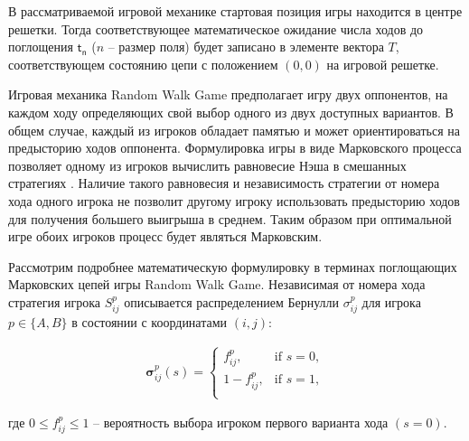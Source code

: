 В рассматриваемой игровой механике стартовая позиция игры находится в центре решетки. 
Тогда соответствующее математическое ожидание числа ходов до поглощения $\boldsymbol{\mathsf{t_n}}$ ($n$ -- размер поля) 
будет записано в элементе вектора $T$, соответствующем состоянию цепи с положением $(0, 0)$ на игровой решетке.


Игровая механика Random Walk Game предполагает игру двух оппонентов, на каждом ходу определяющих свой выбор одного из двух доступных вариантов.
В общем случае, каждый из игроков обладает памятью и может ориентироваться на предысторию ходов оппонента.
Формулировка игры в виде Марковского процесса позволяет одному из игроков вычислить равновесие Нэша в смешанных стратегиях \cite{nash_non-cooperative_1951}.
Наличие такого равновесия и независимость стратегии от номера хода одного игрока не позволит другому игроку использовать предысторию ходов
для получения большего выигрыша в среднем. Таким образом при оптимальной игре обоих игроков процесс будет являться Марковским.

Рассмотрим подробнее математическую формулировку в терминах поглощающих Марковских цепей игры Random Walk Game.
Независимая от номера хода стратегия игрока $S_{ij}^p$ описывается распределением Бернулли $\sigma_{ij}^p$ для игрока 
$p \in \{A, B\}$ в состоянии с координатами $(i, j)$:

\begin{equation}
    \begin{aligned}
    \boldsymbol{\sigma}_{ij}^p(s)=
    \begin{cases}
        f_{ij}^p, &\mbox{if } s = 0,\\ 
        1-f_{ij}^p, &\mbox{if } s = 1,\\
    \end{cases}
    \label{eq:sigma}
    \end{aligned}
\end{equation}

где $0 \leq f_{ij}^p \leq 1$ -- вероятность выбора игроком первого варианта хода $(s=0)$.

